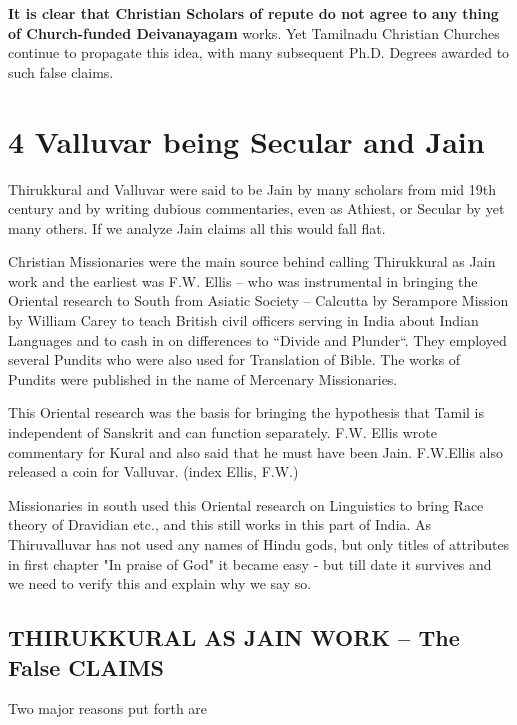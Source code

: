 \textbf{It is clear that Christian Scholars of repute do not agree to any thing of Church-funded Deivanayagam} works. Yet Tamilnadu Christian Churches continue to propagate this idea, with many subsequent Ph.D. Degrees awarded to such false claims.


\section*{4 Valluvar being Secular and Jain}

Thirukkural and Valluvar were said to be Jain by many scholars from mid 19th century and by writing dubious commentaries, even as Athiest, or Secular by yet many others. If we analyze Jain claims all this would fall flat.

Christian Missionaries were the main source behind calling Thirukkural as Jain work and the earliest was F.W. Ellis – who was instrumental in bringing the Oriental research to South from Asiatic Society – Calcutta by Serampore Mission by William Carey to teach British civil officers serving in India about Indian Languages and to cash in on differences to “Divide and Plunder“. They employed several Pundits who were also used for Translation of Bible. The works of Pundits were published in the name of Mercenary Missionaries.

This Oriental research was the basis for bringing the hypothesis that Tamil is independent of Sanskrit and can function separately. F.W. Ellis wrote commentary for Kural and also said that he must have been Jain. F.W.Ellis also released a coin\endnote{} for Valluvar. (index Ellis, F.W.)

Missionaries in south used this Oriental research on Linguistics to bring Race theory of Dravidian etc., and this still works in this part of India. As Thiruvalluvar has not used any names of Hindu gods, but only titles of attributes in first chapter "In praise of God" it became easy - but till date it survives and we need to verify this and explain why we say so.

\subsection*{THIRUKKURAL AS JAIN WORK – The False CLAIMS}

Two major reasons put forth are


